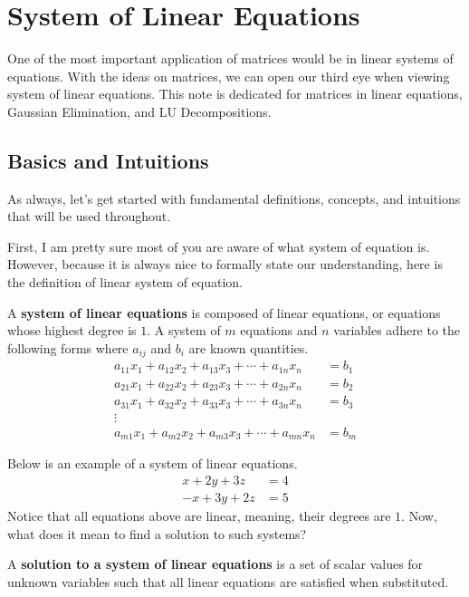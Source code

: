 \documentclass[../main.tex]{subfiles}
\begin{document}
\chapter{System of Linear Equations}

One of the most important application of matrices would be in
linear systems of equations. With the ideas on matrices, we can
open our third eye when viewing system of linear equations.
This note is dedicated for matrices in linear equations,
Gaussian Elimination, and LU Decompositions.

\section{Basics and Intuitions}

As always, let's get started with fundamental definitions, concepts,
and intuitions that will be used throughout.

First, I am pretty sure most of you are aware of what system of
equation is. However, because it is always nice to formally state
our understanding, here is the definition of linear system of
equation.

\begin{definition}
A \textbf{system of linear equations} is composed of linear equations,
or equations whose highest degree is $1$. A system of $m$ equations
and $n$ variables adhere to the following forms where $a_{ij}$ and
$b_{i}$ are known quantities.
\begin{align*}
    a_{11}x_1 + a_{12}x_2 + a_{13}x_3 + \cdots + a_{1n}x_n &= b_1 \\
    a_{21}x_1 + a_{22}x_2 + a_{23}x_3 + \cdots + a_{2n}x_n &= b_2 \\
    a_{31}x_1 + a_{32}x_2 + a_{33}x_3 + \cdots + a_{3n}x_n &= b_3 \\
    \vdots\qquad\qquad& \\
    a_{m1}x_1 + a_{m2}x_2 + a_{m3}x_3 + \cdots + a_{mn}x_n &= b_m
\end{align*}
\end{definition}

Below is an example of a system of linear equations.
\begin{align*}
    x + 2y + 3z &= 4 \\
    -x + 3y + 2z &= 5
\end{align*}
Notice that all equations above are linear, meaning, their degrees
are $1$. Now, what does it mean to find a solution to such systems?

\begin{definition}
A \textbf{solution to a system of linear equations} is a set of
scalar values for unknown variables such that all linear equations
are satisfied when substituted.
\end{definition}
\end{document}
